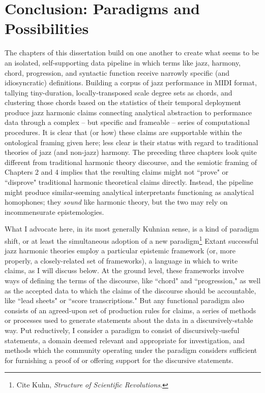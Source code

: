 \chapter{Conclusion: Paradigms and Possibilities}


The chapters of this dissertation build on one another to create what seems to be an isolated, self-supporting data pipeline in which terms like jazz, harmony, chord, progression, and syntactic function receive narrowly specific (and idiosyncratic) definitions.  Building a corpus of jazz performance in MIDI format, tallying tiny-duration, locally-transposed scale degree sets as chords, and clustering those chords based on the statistics of their temporal deployment produce jazz harmonic claims connecting analytical abstraction to performance data through a complex -- but specific and frameable -- series of computational procedures.  It is clear that (or how) these claims are supportable within the ontological framing given here; less clear is their status with regard to traditional theories of jazz (and non-jazz) harmony.  The preceding three chapters look quite different from traditional harmonic theory discourse, and the semiotic framing of Chapters 2 and 4 implies that the resulting claims might not ``prove" or ``disprove" traditional harmonic theoretical claims directly.  Instead, the pipeline might produce similar-seeming analytical interpretants functioning as analytical homophones; they \emph{sound} like harmonic theory, but the two may rely on incommensurate epistemologies.

What I advocate here, in its most generally Kuhnian sense, is a kind of paradigm shift, or at least the simultaneous adoption of a new paradigm\footnote{Cite Kuhn, \emph{Structure of Scientific Revolutions}.}  Extant successful jazz harmonic theories employ a particular epistemic framework (or, more properly, a closely-related set of frameworks), a language in which to write claims, as I will discuss below.  At the ground level, these frameworks involve ways of defining the terms of the discourse, like ``chord" and ``progression," as well as the accepted data to which the claims of the discourse should be accountable, like ``lead sheets" or ``score transcriptions."  But any functional paradigm also consists of an agreed-upon set of production rules for claims, a series of methods or processes used to generate statements about the data in a discursively-stable way.  Put reductively, I consider a paradigm to consist of discursively-useful statements, a domain deemed relevant and appropriate for investigation, and methods which the community operating under the paradigm considers sufficient for furnishing a proof of or offering support for the discursive statements.

